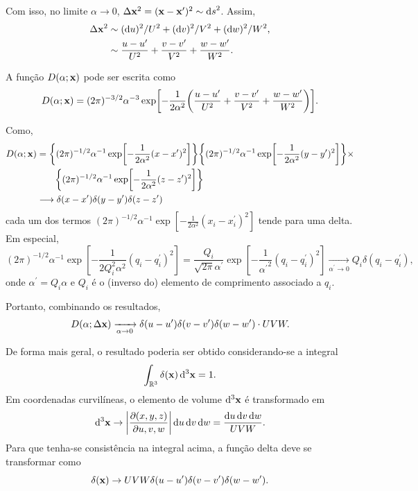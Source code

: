 Com isso, no limite $\alpha \to 0$, $\Delta \vb{x}^2 = (\vb{x} - \vb{x}^\prime)^2 \sim \dd{s}^2$. Assim,
\begin{align*}
  \Delta \vb{x}^2
  &\sim (\dd{u})^2/U^2 + (\dd{v})^2/V^2 + (\dd{w})^2/W^2,
  \\
  &\sim \frac{u - u^\prime}{U^2} + \frac{v - v^\prime}{V^2} + \frac{w - w^\prime}{W^2}.
\end{align*}

A função $D(\alpha; \vb{x})$ pode ser escrita como
\begin{equation*}
  D(\alpha; \vb{x}) = (2\pi)^{-3/2} \alpha^{-3} \exp[-\frac{1}{2\alpha^2}\qty(\frac{u - u^\prime}{U^2} + \frac{v - v^\prime}{V^2} + \frac{w - w^\prime}{W^2})].
\end{equation*}

Como,
\begin{align*}
  D(\alpha; \vb{x})
  &= \qty{(2\pi)^{-1/2}\alpha^{-1} \exp[-\frac{1}{2 \alpha^2} (x-x^\prime)^2]} \qty{(2\pi)^{-1/2}\alpha^{-1} \exp[-\frac{1}{2 \alpha^2} (y-y^\prime)^2]} \times
  \\
  &\qquad  \qty{(2\pi)^{-1/2}\alpha^{-1} \exp[-\frac{1}{2 \alpha^2} (z-z^\prime)^2]}
  \\
  &\longrightarrow \delta(x - x^\prime) \delta(y - y^\prime) \delta(z - z^\prime)
\end{align*}
cada um dos termos $(2\pi)^{-1/2}\alpha^{-1} \exp[-\frac{1}{2 \alpha^2} (x_i - x_i^\prime)^2]$ tende para uma delta. Em especial,
\begin{equation*}
  (2\pi)^{-1/2}\alpha^{-1} \exp[-\frac{1}{2 Q_i^2\alpha^2} (q_i - q_i^\prime)^2] = \frac{Q_i}{\sqrt{2\pi} \alpha^\prime} \exp[-\frac{1}{{\alpha^\prime}^2}(q_i - q_i^\prime)^2] \xrightarrow[\alpha^\prime \to 0]{} Q_i \delta(q_i - q_i^\prime),
\end{equation*}
onde $\alpha^\prime = Q_i \alpha$ e $Q_i$ é o (inverso do) elemento de comprimento associado a $q_i$.

Portanto, combinando os resultados,
\begin{equation*}
  D(\alpha; \Delta\vb{x}) \xrightarrow[\alpha \to 0]{} \delta(u - u^\prime) \delta(v - v^\prime) \delta(w - w^\prime) \cdot UVW.
\end{equation*}

\vspace{5mm}
De forma mais geral, o resultado poderia ser obtido considerando-se a integral
\begin{equation*}
  \int_{\mathbb{R}^3} \delta(\vb{x}) \dd[3]{\vb{x}} = 1.
\end{equation*}
Em coordenadas curvilíneas, o elemento de volume $\dd[3]{\vb{x}}$ é transformado em
\[
  \dd[3]{\vb{x}} \to \abs{\pdv{(x, y, z)}{u, v, w}} \dd{u}\dd{v}\dd{w} = \frac{\dd{u}\dd{v}\dd{w}}{UVW}.
\]
Para que tenha-se consistência na integral acima, a função delta deve se transformar como
\begin{equation*}
  \delta(\vb{x}) \to UVW \delta(u - u^\prime) \delta(v - v^\prime) \delta(w - w^\prime).
\end{equation*}



